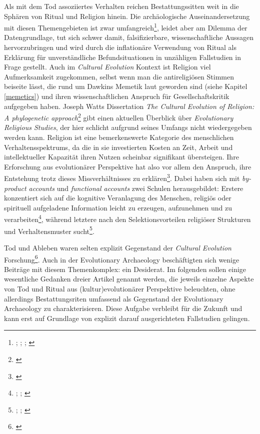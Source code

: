 \documentclass[openany,twoside,twocolumn]{book}
\let\rmarkdownfootnote\footnote%
\def\footnote{\protect\rmarkdownfootnote}
\begin{document}
Als mit dem Tod assoziiertes Verhalten reichen Bestattungssitten weit in die Sphären von Ritual und Religion hinein. Die archäologische Auseinandersetzung mit diesen Themengebieten ist zwar umfangreich\footnote{\textcite{bertemes_archaeology_2001}; \textcite{chapman_archaeology_1981}; \textcite{insoll_archaeology_2004}; \textcite{renfrew_archaeology_1994}}, leidet aber am Dilemma der Datengrundlage, tut sich schwer damit, falsifizierbare, wissenschaftliche Aussagen hervorzubringen und wird durch die inflationäre Verwendung von Ritual als Erklärung für unverständliche Befundsituationen in unzähligen Fallstudien in Frage gestellt. Auch im \emph{Cultural Evolution} Kontext ist Religion viel Aufmerksamkeit zugekommen, selbst wenn man die antireligiösen Stimmen beiseite lässt, die rund um Dawkins Memetik laut geworden sind (siehe Kapitel \ref{memetics}) und ihren wissenschaftlichen Anspruch für Gesellschaftskritik aufgegeben haben. Joseph Watts Dissertation \emph{The Cultural Evolution of Religion: A phylogenetic approach}\footnote{\textcite{watts_cultural_2016}} gibt einen aktuellen Überblick über \emph{Evolutionary Religious Studies}, der hier schlicht aufgrund seines Umfangs nicht wiedergegeben werden kann. Religion ist eine bemerkenswerte Kategorie des menschlichen Verhaltensspektrums, da die in sie investierten Kosten an Zeit, Arbeit und intellektueller Kapazität ihren Nutzen scheinbar signifikant übersteigen. Ihre Erforschung aus evolutionärer Perspektive hat also vor allem den Anspruch, ihre Entstehung trotz dieses Missverhältnisses zu erklären\footnote{\textcite{wilson_evolutionary_2012-1}}. Dabei haben sich mit \emph{by-product accounts} und \emph{functional accounts} zwei Schulen herausgebildet: Erstere konzentiert sich auf die kognitive Veranlagung des Menschen, religiös oder spirituell aufgeladene Information leicht zu erzeugen, aufzunehmen und zu verarbeiten\footnote{\textcite{barrett_exploring_2000}; \textcite{baumard_explaining_2013}; \textcite{boyer_evolutionary_2008}}, während letztere nach den Selektionsvorteilen religiöser Strukturen und Verhaltensmuster sucht\footnote{\textcite{norenzayan_cultural_2016}; \textcite{sosis_adaptationist-byproduct_2009}; \textcite{wilson_darwins_2002}}.

Tod und Ableben waren selten explizit Gegenstand der \emph{Cultural Evolution} Forschung\footnote{\textcite{falger_cultural_2003}}. Auch in der Evolutionary Archaeology beschäftigten sich wenige Beiträge mit diesem Themenkomplex: ein Desiderat. Im folgenden sollen einige wesentliche Gedanken dreier Artikel genannt werden, die jeweils einzelne Aspekte von Tod und Ritual aus (kultur)evolutionärer Perspektive beleuchten, ohne allerdings Bestattungsriten umfassend als Gegenstand der Evolutionary Archaeology zu charakterisieren. Diese Aufgabe verbleibt für die Zukunft und kann erst auf Grundlage von explizit darauf ausgerichteten Fallstudien gelingen.
\end{document}
